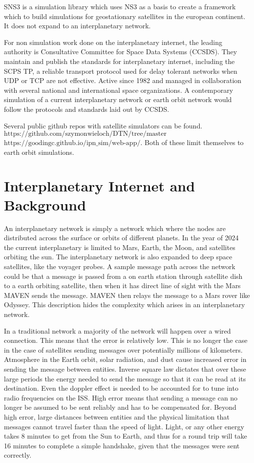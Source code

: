 \documentclass[a4paper,12pt]{article}
\begin{document}
SNS3 is a simulation library which uses NS3 as a basis to create a framework which to build simulations for 
geostationary satellites in the european continent. It does not expand to an interplanetary network.
\cite{10.4108/icst.simutools.2014.254631}

For non simulation work done on the interplanetary internet, the leading authority is Consultative Committee for 
Space Data Systems (CCSDS). \cite{CCSDS.org} They maintain and publish the standards for interplanetary internet, including 
the SCPS TP, a reliable transport protocol used for delay tolerant networks when UDP or TCP are not effective. \cite{40565_2004}
Active since 1982 and managed in collaboration with several national and international space organizations. A 
contemporary simulation of a current interplanetary network or earth orbit network would follow the protocols and
standards laid out by CCSDS.

Several public github repos with satellite simulators can be found. 
$\text{https://github.com/szymonwieloch/DTN/tree/master}$
$\text{https://goodingc.github.io/ipn_sim/web-app/}$. Both of these limit themselves to earth orbit simulations. 

\section{Interplanetary Internet and Background}

An interplanetary network is simply a network which where the nodes are distributed across the surface or orbits of 
different planets. In the year of 2024 the current interplanetary is limited to Mars, Earth, the Moon, and satellites 
orbiting the sun. The interplanetary network is also expanded to deep space satellites, like the voyager probes. A sample 
message path across the network could be that a message is passed from a on earth station through satellite dish to a 
earth orbiting satellite, then when it has direct line of sight with the Mars MAVEN sends the message. MAVEN then relays the 
message to a Mars rover like Odyssey. This description hides the complexity which arises in an interplanetary network. 

In a traditional network a majority of the network will happen over a wired connection. This means that the error is relatively 
low. This is no longer the case in the case of satellites sending messages over potentially millions of kilometers. 
Atmosphere in the Earth orbit, solar radiation, and dust cause increased error in sending the message between entities. 
Inverse square law dictates that over these large periods the energy needed to send the message so that it can be 
read at its destination. Even the doppler effect is needed to be accounted for to tune into radio frequencies on the ISS.
High error means that sending a message can no longer be assumed to be sent reliably and has to be compensated for. 
Beyond high error, large distances between entities and the physical limitation that messages cannot travel faster 
than the speed of light. Light, or any other energy takes 8 minutes to get from the Sun to Earth, and thus for a round trip 
will take 16 minutes to complete a simple handshake, given that the messages were sent correctly.
\end{document}
